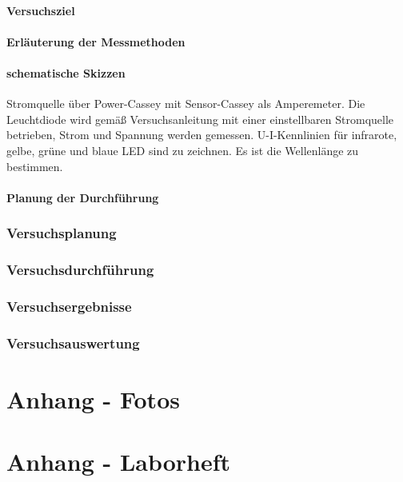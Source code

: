 \documentclass[12pt,oneside,oldfontcommands]{memoir}
\begin{document}
\paragraph{Versuchsziel}
\paragraph{Erläuterung der Messmethoden}
\paragraph{schematische Skizzen}
Stromquelle über Power-Cassey mit Sensor-Cassey als Amperemeter. Die Leuchtdiode wird gemäß Versuchsanleitung mit einer einstellbaren Stromquelle betrieben, Strom und Spannung werden gemessen. U-I-Kennlinien für infrarote, gelbe, grüne und blaue LED sind zu zeichnen.
Es ist die Wellenlänge zu bestimmen.

\paragraph{Planung der Durchführung}
\subsubsection{Versuchsplanung}
\subsubsection{Versuchsdurchführung}
\subsubsection{Versuchsergebnisse}
\subsubsection{Versuchsauswertung}



\section{Anhang - Fotos}
\section{Anhang - Laborheft}
%
       
\end{document}
